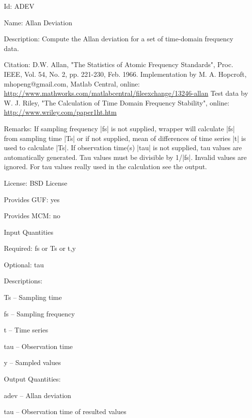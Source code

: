 \begin{tightdesc}
\item [Id:] ADEV
\item [Name:] Allan Deviation
\item [Description:] Compute the Allan deviation for a set of time-domain frequency data.
\item [Citation:] D.W. Allan, "The Statistics of Atomic Frequency Standards", Proc. IEEE, Vol. 54, No. 2, pp. 221-230, Feb. 1966. Implementation by M. A. Hopcroft, mhopeng@gmail.com, Matlab Central, online: \url{http://www.mathworks.com/matlabcentral/fileexchange/13246-allan} Test data by W. J. Riley, "The Calculation of Time Domain Frequency Stability", online: \url{http://www.wriley.com/paper1ht.htm}
\item [Remarks:] If sampling frequency |fs| is not supplied, wrapper will calculate |fs| from sampling time |Ts| or if not supplied, mean of differences of time series |t| is used to calculate |Ts|. If observation time(s) |tau| is not supplied, tau values are automatically generated. Tau values must be divisible by 1/|fs|. Invalid values are ignored. For tau values really used in the calculation see the output.
\item [License:] BSD License
\item [Provides GUF:] yes
\item [Provides MCM:] no
\item [Input Quantities] \rule{0em}{0em}
    \begin{tightdesc}
    \item [Required:] 
        \textsf{fs} or \textsf{Ts} or \textsf{t},\enspace \textsf{y}
    \item [Optional:] 
        \textsf{tau}
    \item [Descriptions:] \rule{0em}{0em}
        \begin{tightdesc}
            \item[\textsf{Ts}] -- Sampling time
            \item[\textsf{fs}] -- Sampling frequency
            \item[\textsf{t}] -- Time series
            \item[\textsf{tau}] -- Observation time
            \item[\textsf{y}] -- Sampled values
        \end{tightdesc}
    \end{tightdesc}
\item [Output Quantities:] \rule{0em}{0em}
    \begin{tightdesc}
        \item[\textsf{adev}] -- Allan deviation
        \item[\textsf{tau}] -- Observation time of resulted values
    \end{tightdesc}
\end{tightdesc}
